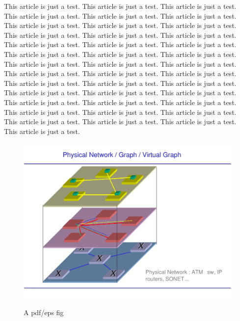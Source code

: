 \documentclass[pdftex,english,a4paper,10pt,twocolumn]{infocom}
\begin{document}
    
This article is just a test. This article is just a test.
This article is just a test. This article is just a test. 
This article is just a test. This article is just a test. 
This article is just a test. This article is just a test. 
This article is just a test. This article is just a test. 
This article is just a test. This article is just a test. 
This article is just a test. This article is just a test. 
This article is just a test. This article is just a test. 
This article is just a test. This article is just a test. 
This article is just a test. This article is just a test. 
This article is just a test. This article is just a test. 
This article is just a test. This article is just a test. 
This article is just a test. This article is just a test. 
This article is just a test. This article is just a test. 
This article is just a test. This article is just a test. 
This article is just a test. This article is just a test. 
This article is just a test. This article is just a test. 
This article is just a test. This article is just a test. 
This article is just a test. This article is just a test. 
This article is just a test. This article is just a test. 


\begin{figure}[hbt]
\begin{center}%
\hypertarget{fig}{}%

{{\includegraphics[scale=.50]{figures/sample}}}
\caption{{{A pdf/eps fig }}}
\label{fig}
\end{center}
\end{figure}
\end{document}
